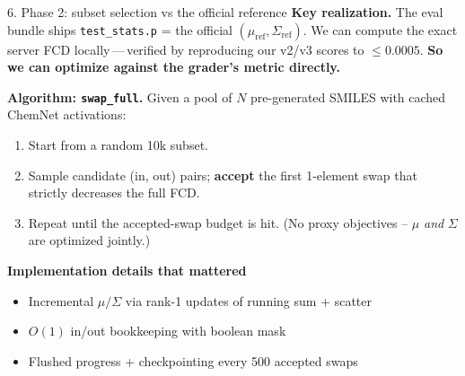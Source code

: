 \documentclass[aspectratio=169,11pt]{beamer}
\begin{document}
\begin{frame}{6. Phase 2: subset selection vs the official reference}
  \textbf{Key realization.}
  The eval bundle ships \texttt{test\_stats.p} = the official
  $(\mu_{\mathrm{ref}}, \Sigma_{\mathrm{ref}})$. We can compute the
  exact server FCD locally\,---\,verified by reproducing our v2/v3
  scores to $\leq 0.0005$. \textbf{So we can optimize against the grader's metric directly.}

  \medskip
  \textbf{Algorithm: \texttt{swap\_full}.}
  Given a pool of $N$ pre-generated SMILES with cached ChemNet
  activations:
  \begin{enumerate}
    \item Start from a random 10k subset.
    \item Sample candidate (in, out) pairs; \textbf{accept} the first 1-element swap that
      strictly decreases the full FCD.
    \item Repeat until the accepted-swap budget is hit. (No proxy
      objectives -- $\mu$ \emph{and} $\Sigma$ are optimized jointly.)
  \end{enumerate}

  \medskip
  \textbf{Implementation details that mattered}
  \begin{itemize}
    \item Incremental $\mu/\Sigma$ via rank-1 updates of running sum + scatter
    \item $O(1)$ in/out bookkeeping with boolean mask
    \item Flushed progress + checkpointing every 500 accepted swaps
  \end{itemize}
\end{frame}
\end{document}
